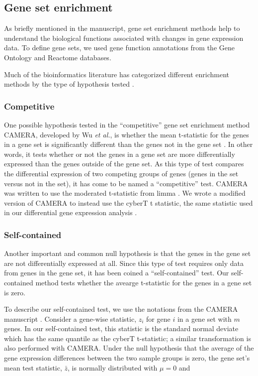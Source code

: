 \subsection{Gene set enrichment}

As briefly mentioned in the manuscript, gene set enrichment methods help to 
understand the biological functions associated with changes in gene expression
data. To define gene sets, we used gene function annotations from the Gene 
Ontology and Reactome databases.

Much of the bioinformatics literature has categorized
different enrichment methods by the type of hypothesis tested \cite{Ackermann:2009bw}.

\subsubsection{Competitive}

One possible hypothesis tested in the ``competitive'' gene set enrichment method
CAMERA, developed by Wu \emph{et al.}, is whether the mean t-statistic for the 
genes in a gene set is significantly different than the genes not in the 
gene set \cite{Wu:2012kp}. In other words, it tests whether or not the genes in a gene set are 
more differentially expressed than the genes outside of the gene set. As 
this type of test compares the differential expression of two competing 
groups of genes (genes in the set versus not in the set), it has come to 
be named a ``competitive'' test. CAMERA was written to use the moderated t-statistic 
from limma \cite{Smyth:2004gh}. We wrote a modified version of CAMERA to instead use
the cyberT t statistic, the same statistic used in our differential gene
expression analysis \cite{Baldi:2001ul}.

\subsubsection{Self-contained}

Another important and common null hypothesis is that the genes in the gene set are 
not differentially expressed at all. Since this type of test requires only data 
from genes in the gene set, it has been coined a ``self-contained'' test. 
Our self-contained method tests whether the avearge t-statistic for the genes 
in a gene set is zero.

To describe our self-contained test, we use the 
notations from the CAMERA manuscript \cite{Wu:2012kp}.
Consider a gene-wise statistic, $z_i$ for gene $i$ in
a gene set with $m$ genes. In our self-contained test, this statistic is the 
standard normal deviate which has the
same quantile as the cyberT t-statistic; a similar transformation is also 
performed with CAMERA. Under the null hypothesis that
the average of the gene expression differences between the two sample groups is zero, 
the gene set's mean test statistic, $\bar{z}$, is normally distributed with
$\mu{}=0$ and


